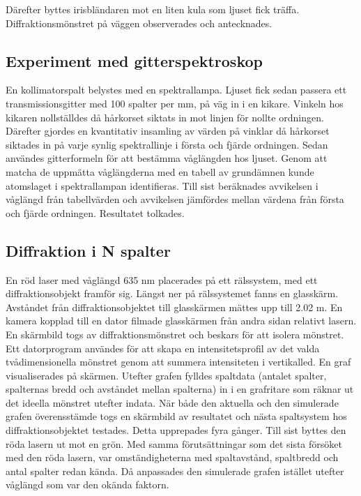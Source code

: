 \documentclass[conference]{IEEEtran}
\begin{document}
Därefter byttes irisbländaren mot en liten kula som ljuset fick träffa. Diffraktionsmönstret på väggen observerades och antecknades. 

\subsection{\textbf{Experiment med gitterspektroskop}}
En kollimatorspalt belystes med en spektrallampa. Ljuset fick sedan passera ett transmissionsgitter med 100 spalter per mm, på väg in i en kikare. Vinkeln hos kikaren nollställdes då hårkorset siktats in mot linjen för nollte ordningen. Därefter gjordes en kvantitativ insamling av värden på vinklar då hårkorset siktades in på varje synlig spektrallinje i första och fjärde ordningen. 
Sedan användes gitterformeln för att bestämma våglängden hos ljuset. Genom att matcha de uppmätta våglängderna med en tabell av grundämnen kunde atomslaget i spektrallampan identifieras. Till sist beräknades avvikelsen i våglängd från tabellvärden och avvikelsen jämfördes mellan värdena från första och fjärde ordningen. Resultatet tolkades. 

\subsection{\textbf{Diffraktion i N spalter}}
En röd laser med våglängd 635 nm placerades på ett rälssystem, med ett diffraktionsobjekt framför sig. Längst ner på rälssystemet fanns en glasskärm. Avståndet från diffraktionsobjektet till glasskärmen mättes upp till 2.02 m. En kamera kopplad till en dator filmade glasskärmen från andra sidan relativt lasern. En skärmbild togs av diffraktionsmönstret och beskars för att isolera mönstret. Ett datorprogram användes för att skapa en intensitetsprofil av det valda tvådimensionella mönstret genom att summera intensiteten i vertikalled. En graf visualiserades på skärmen. Utefter grafen fylldes spaltdata (antalet spalter, spalternas bredd och avståndet mellan spalterna) in i en grafritare som räknar ut det ideella mönstret utefter indata. När både den aktuella och den simulerade grafen överensstämde togs en skärmbild av resultatet och nästa spaltsystem hos diffraktionsobjektet testades. Detta upprepades fyra gånger. Till sist byttes den röda lasern ut mot en grön. Med samma förutsättningar som det sista försöket med den röda lasern, var omständigheterna med spaltavstånd, spaltbredd och antal spalter redan kända. Då anpassades den simulerade grafen istället utefter våglängd som var den okända faktorn.  
\end{document}

